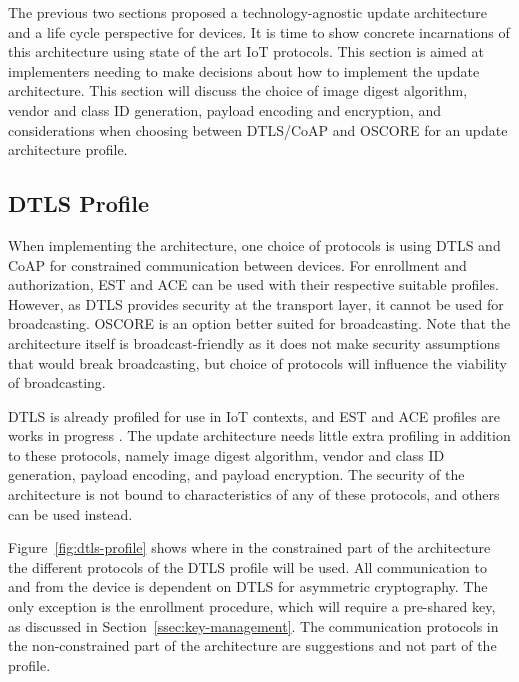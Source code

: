 \documentclass[0-thesis.tex]{subfiles}
\begin{document}
\label{chap:profiles}
The previous two sections proposed a technology-agnostic update architecture and a life
cycle perspective for devices. It is time to show concrete incarnations of this
architecture using state of the art IoT protocols. This section is aimed at implementers
needing to make decisions about how to implement the update architecture. This section
will discuss the choice of image digest algorithm, vendor and class ID generation, payload
encoding and encryption, and considerations when choosing between DTLS/CoAP and OSCORE for
an update architecture profile.

\subsection{DTLS Profile}
\label{ssec:dtls-profile}
When implementing the architecture, one choice of protocols is using DTLS and CoAP for
constrained communication between devices. For enrollment and authorization, EST and ACE
can be used with their respective suitable profiles. However, as DTLS provides security at
the transport layer, it cannot be used for broadcasting. OSCORE is an option better suited
for broadcasting. Note that the architecture itself is broadcast-friendly as it does not
make security assumptions that would break broadcasting, but choice of protocols will
influence the viability of broadcasting.

DTLS is already profiled for use in IoT contexts, and EST and ACE profiles are works in
progress \parencite{rfc7925, est-coaps, ace-dtls-profile}. The update architecture needs
little extra profiling in addition to these protocols, namely image digest algorithm,
vendor and class ID generation, payload encoding, and payload encryption. The security of
the architecture is not bound to characteristics of any of these protocols, and others can
be used instead.

Figure~\ref{fig:dtls-profile} shows where in the constrained part of the architecture the
different protocols of the DTLS profile will be used. All communication to and from the
device is dependent on DTLS for asymmetric cryptography. The only exception is the
enrollment procedure, which will require a pre-shared key, as discussed in
Section~\ref{ssec:key-management}. The communication protocols in the non-constrained part
of the architecture are suggestions and not part of the profile.
\end{document}

